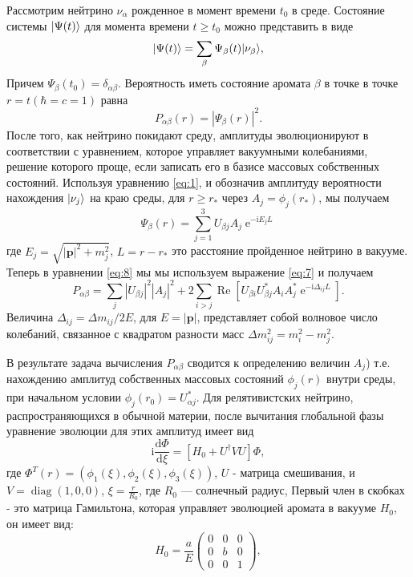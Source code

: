 \documentclass[a4paper,12pt]{article}
\newcommand\Vect[1]{{\boldsymbol{#1}}}
\newcommand{\dd}{\mathrm{d}}
\newcommand{\diag}{\operatorname{diag}}
\renewcommand{\Re}{\operatorname{Re}}
\renewcommand{\exp}{\operatorname{e}}
\renewcommand{\imath}{\mathrm{i}}
\DeclarePairedDelimiter\ket{|}{\rangle}
\begin{document}
	Рассмотрим нейтрино \(\nu_{\alpha}\) рожденное в момент времени
	\(t_{0}\) в среде. Состояние системы \(\ket{\Psi(t)}\) для момента времени \(t\geq t_{0}\) можно представить в виде
	\begin{equation}
		\ket{\Psi(t)}=\sum_{\beta}\Psi_{\beta}(t)\ket{\nu_{\beta}},
	\end{equation}
	Причем \(\Psi_{\beta}(t_{0})=\delta_{\alpha\beta}\). Вероятность иметь состояние аромата \(\beta\) в точке в точке \(r=t (\hbar=c=1)\) равна
	\begin{equation}\label{eq:8}
		P_{\alpha\beta}(r)=|\Psi_{\beta}(r)|^{2}.
	\end{equation}
	После того, как нейтрино покидают среду, амплитуды
	эволюционируют в соответствии с уравнением, которое
	управляет вакуумными колебаниями, решение которого
	проще, если записать его в базисе массовых собственных
	состояний. Используя уравнению \eqref{eq:1}, и обозначив амплитуду вероятности нахождения
	\(\ket{\nu_{j}}\) на краю среды, для \(r\geq r_{*}\) через \(A_{j}=\phi_{j}(r_{*})\), мы получаем
	\begin{equation}\label{eq:7}
		\Psi_{\beta}(r)=\sum_{j=1}^{3}U_{\beta j}A_{j}\exp^{-\imath E_{j}L}
	\end{equation}
	где \(E_{j}=\sqrt{|\Vect{p}|^{2}+m_{j}^{2}}\), \(L=r-r_{*}\) это расстояние
	пройденное нейтрино в вакууме. Теперь в
	уравнении \eqref{eq:8} мы мы используем выражение \eqref{eq:7} и получаем
	\begin{equation}
		P_{\alpha\beta}=\sum_{j}|U_{\beta j}|^{2}|A_{j}|^{2}+2\sum_{i>j}\Re[U_{\beta i}U_{\beta j}^{*}A_{i}A_{j}^{*}\exp^{-\imath\Delta_{ij}L}].
	\end{equation}
	Величина \(\Delta_{ij}=\Delta m_{ij}/2E\), для \(E=|\Vect{p}|\), представляет собой  волновое число колебаний, связанное с квадратом разности масс
	\(\Delta m_{ij}^{2}=m_{i}^{2}-m_{j}^{2}\).
	
	В результате задача вычисления \(P_{\alpha\beta}\) сводится к
	определению величин \(A_{j}\)) т.е. нахождению амплитуд
	собственных массовых состояний \(\phi_{j}(r)\) внутри среды, при начальном условии \(\phi_{j}(r_{0})=U_{\alpha j}^{*}\). Для релятивистских нейтрино, распространяющихся в обычной материи, после вычитания глобальной фазы уравнение эволюции для этих амплитуд имеет вид
	\begin{equation}\label{eq:1}
		\imath\frac{\dd\Phi}{\dd\xi}=[H_{0}+U^{\dagger}VU]\Phi,
	\end{equation}
	где \(\Phi^{T}(r)=(\phi_{1}(\xi),\phi_{2}(\xi),\phi_{3}(\xi))\), \(U\) - матрица
	смешивания, и \(V=\diag(1,0,0)\), \(\xi=\frac{r}{R_{0}}\), где \(R_{0}\) --- солнечный радиус, Первый член в скобках - это матрица Гамильтона, которая управляет эволюцией аромата в вакууме \(H_{0}\), он имеет вид:
	\begin{equation}
		H_{0}=\frac{a}{E}
		\begin{pmatrix}
			0 & 0 & 0\\
			0 & b & 0\\
			0 & 0 & 1
		\end{pmatrix},
	\end{equation}
	
\end{document}
